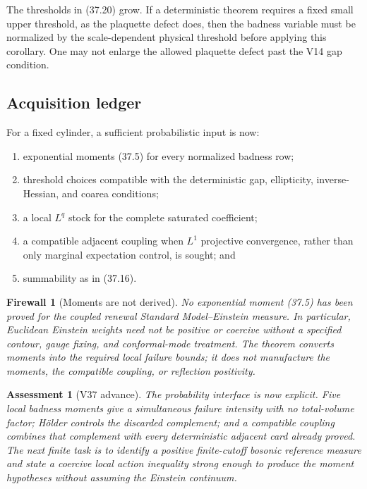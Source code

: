 \documentclass[11pt]{article}
\newtheorem{assessment}[theorem]{Assessment}
\newtheorem{firewall}[theorem]{Firewall}
\begin{document}
The thresholds in (37.20) grow.  If a deterministic theorem requires a
fixed small upper threshold, as the plaquette defect does, then the
badness variable must be normalized by the scale-dependent physical
threshold before applying this corollary.  One may not enlarge the
allowed plaquette defect past the V14 gap condition.

\subsection{Acquisition ledger}

For a fixed cylinder, a sufficient probabilistic input is now:
\begin{enumerate}[label=\textnormal{(\roman*)}]
\item exponential moments (37.5) for every normalized badness row;
\item threshold choices compatible with the deterministic gap,
ellipticity, inverse-Hessian, and coarea conditions;
\item a local \(L^q\) stock for the complete saturated coefficient;
\item a compatible adjacent coupling when \(L^1\) projective
convergence, rather than only marginal expectation control, is sought;
and
\item summability as in (37.16).
\end{enumerate}

\begin{firewall}[Moments are not derived]
\label{fw:v11v37-moments}
No exponential moment (37.5) has been proved for the coupled renewal
Standard Model--Einstein measure.  In particular, Euclidean Einstein
weights need not be positive or coercive without a specified contour,
gauge fixing, and conformal-mode treatment.  The theorem converts
moments into the required local failure bounds; it does not manufacture
the moments, the compatible coupling, or reflection positivity.
\end{firewall}

\begin{assessment}[V37 advance]
\label{ass:v11v37}
The probability interface is now explicit.  Five local badness moments
give a simultaneous failure intensity with no total-volume factor;
Hölder controls the discarded complement; and a compatible coupling
combines that complement with every deterministic adjacent card already
proved.  The next finite task is to identify a positive finite-cutoff
bosonic reference measure and state a coercive local action inequality
strong enough to produce the moment hypotheses without assuming the
Einstein continuum.
\end{assessment}
\end{document}
